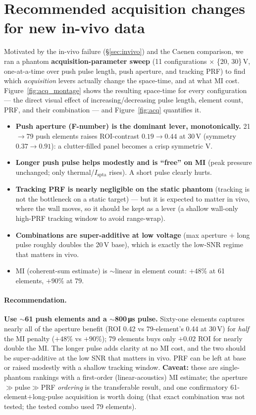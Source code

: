 \documentclass[11pt,a4paper]{article}
\newcommand{\good}[1]{\textcolor{green!45!black}{\textbf{#1}}}
\newcommand{\caveat}[1]{\textcolor{orange!75!black}{\textbf{#1}}}
\begin{document}
\section{Recommended acquisition changes for new in-vivo data}\label{sec:acq}
Motivated by the in-vivo failure (\S\ref{sec:invivo}) and the Caenen comparison, we ran a phantom
\textbf{acquisition-parameter sweep} (11 configurations $\times$ \{20, 30\}\,V, one-at-a-time over push
pulse length, push aperture, and tracking PRF) to find which \emph{acquisition} levers actually change the
space-time, and at what MI cost. Figure~\ref{fig:acq_montage} shows the resulting space-time for every
configuration --- the direct visual effect of increasing/decreasing pulse length, element count, PRF, and
their combination --- and Figure~\ref{fig:acq} quantifies it.

\begin{itemize}
  \item \good{Push aperture (F-number) is the dominant lever, monotonically.} 21$\rightarrow$79 push
  elements raises ROI-contrast $0.19\rightarrow0.44$ at 30\,V (symmetry $0.37\rightarrow0.91$): a
  clutter-filled panel becomes a crisp symmetric V.
  \item \textbf{Longer push pulse helps modestly and is ``free'' on MI} (peak pressure unchanged; only
  thermal/$I_\mathrm{spta}$ rises). A short pulse clearly hurts.
  \item \textbf{Tracking PRF is nearly negligible on the static phantom} (tracking is not the bottleneck on
  a static target) --- but it is expected to matter in vivo, where the wall moves, so it should be kept as a
  lever (a shallow wall-only high-PRF tracking window to avoid range-wrap).
  \item \textbf{Combinations are super-additive at low voltage} (max aperture $+$ long pulse roughly doubles
  the 20\,V base), which is exactly the low-SNR regime that matters in vivo.
  \item MI (coherent-sum estimate) is $\sim$linear in element count: $+48\%$ at 61 elements, $+90\%$ at 79.
\end{itemize}

\paragraph{Recommendation.} \good{Use $\sim$61 push elements and a $\sim$800\,\si{\micro s} pulse.} Sixty-one
elements captures nearly all of the aperture benefit (ROI 0.42 vs 79-element's 0.44 at 30\,V) for
\emph{half} the MI penalty ($+48\%$ vs $+90\%$); 79 elements buys only $+0.02$ ROI for nearly double the MI.
The longer pulse adds clarity at no MI cost, and the two should be super-additive at the low SNR that matters
in vivo. PRF can be left at base or raised modestly with a shallow tracking window. \caveat{Caveat:} these are
single-phantom rankings with a first-order (linear-acoustics) MI estimate; the aperture$\gg$pulse$\gg$PRF
\emph{ordering} is the transferable result, and one confirmatory 61-element$+$long-pulse acquisition is worth
doing (that exact combination was not tested; the tested combo used 79 elements).
\end{document}
